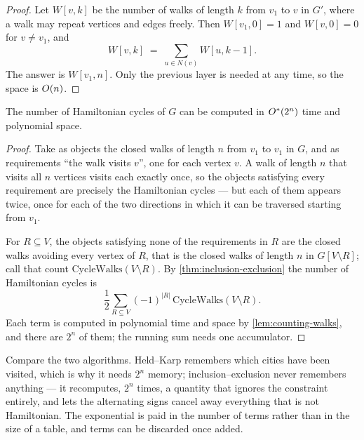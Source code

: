 \begin{proof}
Let $W[v,k]$ be the number of walks of length $k$ from $v_1$ to $v$ in $G'$,
where a walk may repeat vertices and edges freely. Then $W[v_1,0] = 1$ and
$W[v,0] = 0$ for $v \ne v_1$, and
\[ W[v,k] \;=\; \sum_{u \in N(v)} W[u,k-1]. \]
The answer is $W[v_1,n]$. Only the previous layer is needed at any time, so the
space is $O\!\left(n\right)$.
\end{proof}

\begin{theorem}\label{thm:ie-hamilton}
The number of Hamiltonian cycles of $G$ can be computed in $O^{*}(2^n)$ time
and polynomial space.
\end{theorem}

\begin{proof}
Take as objects the closed walks of length $n$ from $v_1$ to $v_1$ in $G$, and
as requirements ``the walk visits $v$'', one for each vertex $v$. A walk of
length $n$ that visits all $n$ vertices visits each exactly once, so the objects
satisfying every requirement are precisely the Hamiltonian cycles --- but each
of them appears twice, once for each of the two directions in which it can be
traversed starting from $v_1$.

For $R \subseteq V$, the objects satisfying none of the requirements in $R$ are
the closed walks avoiding every vertex of $R$, that is the closed walks of
length $n$ in $G[V \setminus R]$; call that count
$\mathrm{CycleWalks}(V \setminus R)$. By \cref{thm:inclusion-exclusion} the
number of Hamiltonian cycles is
\[ \frac{1}{2} \sum_{R \subseteq V} (-1)^{|R|}\,
   \mathrm{CycleWalks}(V \setminus R). \]
Each term is computed in polynomial time and space by
\cref{lem:counting-walks}, and there are $2^n$ of them; the running sum needs
one accumulator.
\end{proof}

\begin{intuition}
Compare the two algorithms. Held--Karp remembers which cities have been visited,
which is why it needs $2^n$ memory; inclusion--exclusion never remembers
anything --- it recomputes, $2^n$ times, a quantity that ignores the constraint
entirely, and lets the alternating signs cancel away everything that is not
Hamiltonian. The exponential is paid in the number of terms rather than in the
size of a table, and terms can be discarded once added.
\end{intuition}

